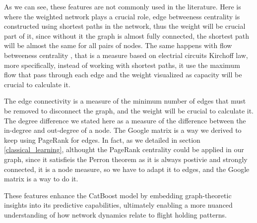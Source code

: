 As we can see, these features are not commonly used in the literature. Here is where the weighted network plays a crucial role, edge betweeness centrality \cite{newman2004finding} is constructed using shortest paths in the network, thus the weight will be crucial part of it, since without it the graph is almost fully connected, the shortest path will be almost the same for all pairs of nodes. The same happens with flow betweeness centrality \cite{freeman1991centrality}, that is a measure based on electrial circuits Kirchoff law, more specifically, instead of working with shortest paths, it use the maximum flow that pass through each edge and the weight visualized as capacity will be crucial to calculate it. 

The edge connectivity is a measure of the minimum number of edges that must be removed to disconnect the graph, and the weight will be crucial to calculate it. The degree difference we stated here as a measure of the difference between the in-degree and out-degree of a node. The Google matrix is a way we derived to keep using PageRank for edges. In fact, as we detailed in section \ref{classical_learning}, althought the PageRank centrality could be applied in our graph, since it satisfieis the Perron theorem as it is always postivie and strongly connected, it is a node measure, so we have to adapt it to edges, and the Google matrix is a way to do it. 

These features enhance the CatBoost model by embedding graph-theoretic insights into its predictive capabilities, ultimately enabling a more nuanced understanding of how network dynamics relate to flight holding patterns.


